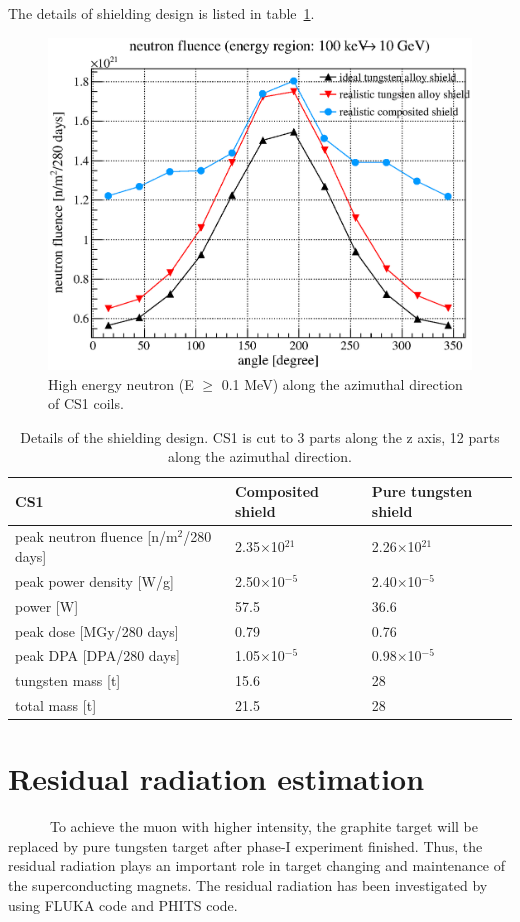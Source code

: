 The details of shielding design is listed in table~\ref{hrsdet}.
 \begin{figure}[H]
  \centering
  \includegraphics[scale=0.43]{chapter3/fig/fluence.eps}
  \caption{High energy neutron (E $\geq$ 0.1 MeV) along the azimuthal direction of CS1 coils.}
  \label{2flux}
 \end{figure}
\begin{table}[H]
 \centering
 \begin{tabular}{lll} \hline \hline
  CS1 & Composited shield & Pure tungsten shield \\ \hline
  peak neutron fluence [n/m$^2$/280 days] & 2.35$\times$10$^{21}$ & 2.26$\times$10$^{21}$ \\
  peak power density [W/g] & 2.50$\times$10$^{-5}$ & 2.40$\times$10$^{-5}$ \\
  power [W] & 57.5 & 36.6 \\
  peak dose [MGy/280 days] & 0.79 & 0.76 \\
  peak DPA [DPA/280 days] & 1.05$\times$10$^{-5}$ & 0.98$\times$10$^{-5}$ \\
  tungsten mass [t] & 15.6 & 28 \\
  total mass [t] & 21.5 & 28 \\ \hline \hline
 \end{tabular}
 \caption{Details of the shielding design. CS1 is cut to 3 parts along the z axis, 12 parts along the azimuthal direction.}
 \label{hrsdet}
\end{table}

 \section{Residual radiation estimation}
~~~~~~To achieve the muon with higher intensity, the graphite target will be replaced by pure tungsten target after phase-I experiment finished.
Thus, the residual radiation plays an important role in target changing and maintenance of the superconducting magnets.
The residual radiation has been investigated by using FLUKA code and PHITS code.

